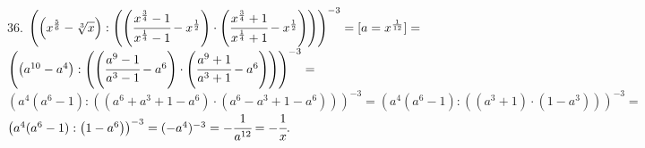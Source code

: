 36. $\left(\left(x^\frac{5}{6}-\sqrt[3]{x}\right):\left(\left(
\cfrac{x^\frac{3}{4}-1}{x^\frac{1}{4}-1}-x^\frac{1}{2}\right)\cdot
\left(
\cfrac{x^\frac{3}{4}+1}{x^\frac{1}{4}+1}-x^\frac{1}{2}\right)\right)\right)^{-3}=[a=x^\frac{1}{12}]=$\\$
\left(\left(a^{10}-a^4\right):\left(\left(\cfrac{a^9-1}{a^3-1}-a^6\right)\cdot\left(\cfrac{a^9+1}{a^3+1}-a^6\right)\right)\right)^{-3}=$\\$
\left(a^4(a^6-1):\left(\left(a^6+a^3+1-a^6\right)\cdot\left(a^6-a^3+1-a^6\right)\right)\right)^{-3}=
\left(a^4(a^6-1):\left(\left(a^3+1\right)\cdot\left(1-a^3\right)\right)\right)^{-3}=$\\$
\left(a^4(a^6-1):\left(1-a^6\right)\right)^{-3}=(-a^4)^{-3}=-\cfrac{1}{a^{12}}=-\cfrac{1}{x}.$\\
